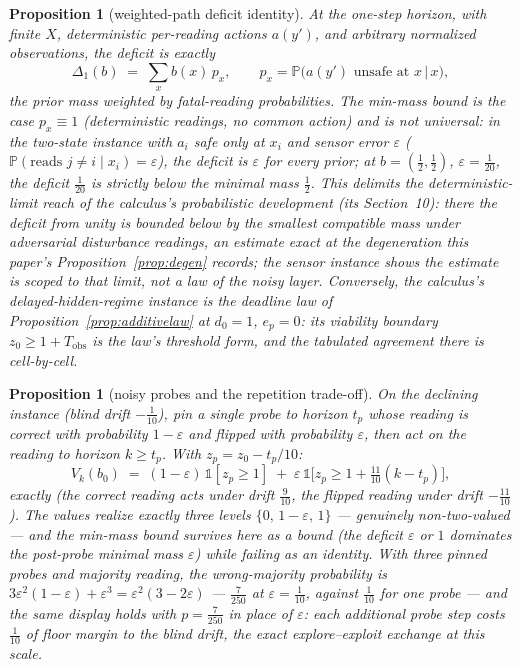 \documentclass[10pt,twocolumn]{article}
\theoremstyle{plain}
\newtheorem{proposition}[theorem]{Proposition}
\theoremstyle{definition}
\theoremstyle{remark}
\begin{document}
\begin{proposition}[weighted-path deficit identity]\label{prop:pathdeficit}
At the one-step horizon, with finite \(X\), deterministic per-reading
actions \(a(y')\), and arbitrary normalized observations, the deficit
is exactly
\[
\Delta_{1}(b) \;=\; \sum_{x} b(x)\, p_{x},
\qquad p_{x} = \mathbb{P}\bigl(a(y') \text{ unsafe at } x \,\big|\, x\bigr),
\]
the prior mass weighted by fatal-reading probabilities. The min-mass
bound is the case \(p_{x} \equiv 1\) (deterministic readings, no
common action) and is \emph{not universal}: in the two-state instance
with \(a_{i}\) safe only at \(x_{i}\) and sensor error \(\varepsilon\)
(\(\mathbb{P}(\text{reads } j \ne i \mid x_{i}) = \varepsilon\)),
the deficit is \(\varepsilon\) for every prior; at
\(b = (\tfrac12, \tfrac12)\), \(\varepsilon = \tfrac1{20}\), the
deficit \(\tfrac1{20}\) is strictly below the minimal mass
\(\tfrac12\). This delimits the deterministic-limit reach of the
calculus's probabilistic development (its Section~10): there the
deficit from unity is bounded below by the smallest compatible mass
under adversarial disturbance readings, an estimate exact at the
degeneration this paper's Proposition~\ref{prop:degen} records; the
sensor instance shows the estimate is scoped to that limit, not a law
of the noisy layer. Conversely, the calculus's delayed-hidden-regime
instance is the deadline law of
Proposition~\ref{prop:additivelaw} at \(d_{0} = 1\), \(e_{p} = 0\):
its viability boundary \(z_{0} \ge 1 + T_{\mathrm{obs}}\) is the
law's threshold form, and the tabulated agreement there is
cell-by-cell.
\end{proposition}

\begin{proposition}[noisy probes and the repetition trade-off]\label{prop:noisyprobe}
On the declining instance (blind drift \(-\tfrac1{10}\)), pin a single
probe to horizon \(t_{p}\) whose reading is correct with probability
\(1 - \varepsilon\) and flipped with probability \(\varepsilon\),
then act on the reading to horizon \(k \ge t_{p}\). With
\(z_{p} = z_{0} - t_{p}/10\):
\[
V_{k}(b_{0}) \;=\; (1 - \varepsilon)\,\mathbb{1}[z_{p} \ge 1]
\;+\; \varepsilon\,\mathbb{1}\bigl[z_{p} \ge 1 + \tfrac{11}{10}(k - t_{p})\bigr],
\]
exactly (the correct reading acts under drift \(\tfrac9{10}\), the
flipped reading under drift \(-\tfrac{11}{10}\)). The values realize
exactly three levels \(\{0,\, 1 - \varepsilon,\, 1\}\) ---
genuinely non-two-valued --- and the min-mass bound survives here as a
bound (the deficit \(\varepsilon\) or \(1\) dominates the
post-probe minimal mass \(\varepsilon\)) while failing as an
identity. With three pinned probes and majority reading, the
wrong-majority probability is
\(3\varepsilon^{2}(1 - \varepsilon) + \varepsilon^{3} = \varepsilon^{2}(3 - 2\varepsilon)\)
--- \(\tfrac{7}{250}\) at \(\varepsilon = \tfrac1{10}\), against
\(\tfrac1{10}\) for one probe --- and the same display holds with
\(p = \tfrac{7}{250}\) in place of \(\varepsilon\): each
additional probe step costs \(\tfrac1{10}\) of floor margin to the
blind drift, the exact explore--exploit exchange at this scale.
\end{proposition}
\end{document}
